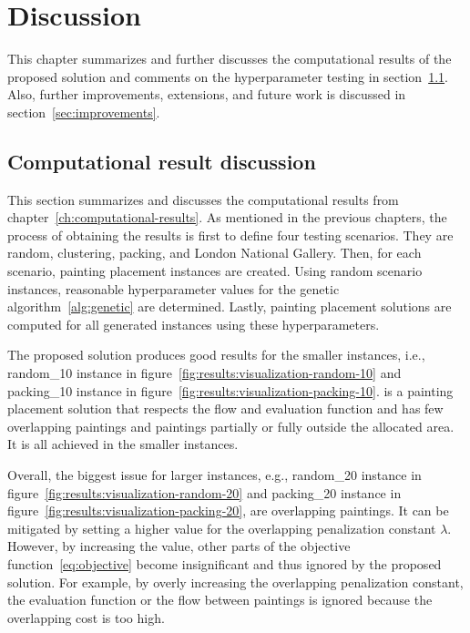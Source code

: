 \chapter{Discussion}\label{ch:discussion}

This chapter summarizes and further discusses the computational results of the proposed solution
and comments on the hyperparameter testing in section~\ref{sec:comp-res-discussion}.
Also, further improvements, extensions, and future work is discussed in section~\ref{sec:improvements}.


\section{Computational result discussion}\label{sec:comp-res-discussion}
This section summarizes and discusses the computational results from chapter~\ref{ch:computational-results}.
As mentioned in the previous chapters, the process of obtaining the results is first to define four testing scenarios.
They are random, clustering, packing, and London National Gallery.
Then, for each scenario, painting placement instances are created.
Using random scenario instances, reasonable hyperparameter values for the genetic algorithm~\ref{alg:genetic} are determined.
Lastly, painting placement solutions are computed for all generated instances using these hyperparameters.

The proposed solution produces good results for the smaller instances, i.e., random\_10 instance
in figure~\ref{fig:results:visualization-random-10} and packing\_10 instance in figure~\ref{fig:results:visualization-packing-10}.
 is a painting placement solution that respects the flow and evaluation function
and has few overlapping paintings and paintings partially or fully outside the allocated area.
It is all achieved in the smaller instances.

Overall, the biggest issue for larger instances, e.g., random\_20 instance in figure~\ref{fig:results:visualization-random-20} and packing\_20 instance in figure~\ref{fig:results:visualization-packing-20}, are overlapping paintings.
It can be mitigated by setting a higher value for the overlapping penalization constant $\lambda$.
However, by increasing the value, other parts of the objective function~\ref{eq:objective}
become insignificant and thus ignored by the proposed solution.
For example, by overly increasing the overlapping penalization constant, the evaluation function
or the flow between paintings is ignored because the overlapping cost is too high.


